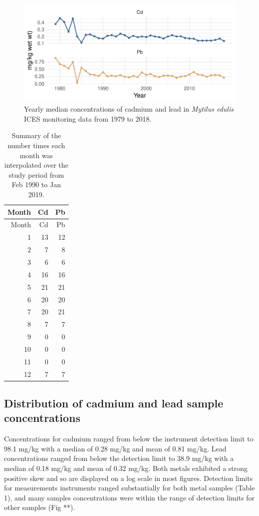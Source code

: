 \documentclass[
  12pt,
]{article}
\begin{document}
\begin{figure}
\centering
\includegraphics{McCrory_ENV972_Project_files/figure-latex/unnamed-chunk-3-1.pdf}
\caption{Yearly median concentrations of cadmium and lead in
\emph{Mytilus edulis} ICES monitoring data from 1979 to 2018.}
\end{figure}

\begin{longtable}[]{@{}rrr@{}}
\caption{Summary of the number times each month was interpolated over
the study period from Feb 1990 to Jan 2019.}\tabularnewline
\toprule
Month & Cd & Pb\tabularnewline
\midrule
\endfirsthead
\toprule
Month & Cd & Pb\tabularnewline
\midrule
\endhead
1 & 13 & 12\tabularnewline
2 & 7 & 8\tabularnewline
3 & 6 & 6\tabularnewline
4 & 16 & 16\tabularnewline
5 & 21 & 21\tabularnewline
6 & 20 & 20\tabularnewline
7 & 20 & 21\tabularnewline
8 & 7 & 7\tabularnewline
9 & 0 & 0\tabularnewline
10 & 0 & 0\tabularnewline
11 & 0 & 0\tabularnewline
12 & 7 & 7\tabularnewline
\bottomrule
\end{longtable}

\hypertarget{distribution-of-cadmium-and-lead-sample-concentrations}{%
\subsection{Distribution of cadmium and lead sample
concentrations}\label{distribution-of-cadmium-and-lead-sample-concentrations}}

Concentrations for cadmium ranged from below the instrument detection
limit to 98.1 mg/kg with a median of 0.28 mg/kg and mean of 0.81 mg/kg.
Lead concentrations ranged from below the detection limit to 38.9 mg/kg
with a median of 0.18 mg/kg and mean of 0.32 mg/kg. Both metals
exhibited a strong positive skew and so are displayed on a log scale in
most figures. Detection limits for measurements instruments ranged
substantially for both metal samples (Table 1), and many samples
concentrations were within the range of detection limits for other
samples (Fig **).
\end{document}
